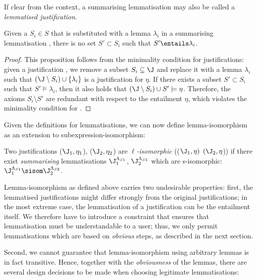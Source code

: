 If clear from the context, a summarising lemmatisation \lemmaj may also be called a \emph{lemmatised justification}.
\begin{prop}
Given a $S_{i} \in S$ that is substituted with a lemma $\lambda_{i}$ in a summarising lemmatisation \lemmaj, there is no set $S' \subset S_{i}$ such that $S' \entails \lambda_{i}$.
\end{prop}
\begin{proof}
This proposition follows from the minimality condition for justifications: given a justification \justeta, we remove a subset $S_{i} \subseteq\J$ and replace it with a lemma $\lambda_{i}$ such that $(\J \setminus S_{i}) \cup \{\lambda_{i} \}$ is a justification for $\eta$. If there exists a subset $S' \subset S_{i}$ such that $S' \models \lambda_{i}$, then it also holds that $(\J \setminus S_{i}) \cup S' \models \eta $. Therefore, the axioms $S_{i} \setminus S'$ are redundant with respect to the entailment $\eta$, which violates the minimality condition for \lemmaj.
\end{proof}

Given the definitions for lemmatisations, we can now define lemma-isomorphism as an extension to subexpression-isomorphism:
\begin{defn}
Two justifications ($\J_{1},\eta_{1}$), ($\J_{2} ,\eta_{2}$)  are \emph{$\ell$-isomorphic}  (($\J_{1},\eta)$ \lisom $(\J_{2},\eta$)) if there exist \emph{summarising} lemmatisations $\J_{1}^{\Lambda_{S1}}$, $\J_{2}^{\Lambda_{S2}}$ which are s-isomorphic: $\J_{1}^{\Lambda_{S1}} \sisom \J_{2}^{\Lambda_{S2}} $. 
\end{defn}

Lemma-isomorphism as defined above carries two undesirable properties: first, the lemmatised justifications might differ strongly from the original justifications; in the most extreme case, the lemmatisation of a justification can be the entailment itself. We therefore have to introduce a constraint that ensures that lemmatisation must be understandable to a user; thus, we only permit lemmatisations which are based on \emph{obvious} steps, as described in the next section.

Second, we cannot guarantee that lemma-isomorphism using arbitrary lemmas is in fact transitive. Hence, together with the \emph{obviousness} of the lemmas, there are several design decisions to be made when choosing legitimate lemmatisations:

